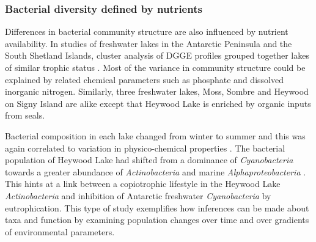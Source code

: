 \subsubsection{Bacterial diversity defined by nutrients}
Differences in bacterial community structure are also influenced by nutrient availability.
In studies of freshwater lakes in the Antarctic Peninsula and the South Shetland Islands, cluster analysis of DGGE profiles grouped together lakes of similar trophic status 
\cite{Schiaffino2009, Villaescusa2010}.
Most of the variance in community structure could be explained by related chemical parameters such as phosphate and dissolved inorganic nitrogen.
Similarly, three freshwater lakes, Moss, Sombre and Heywood on Signy Island are alike except that Heywood Lake is enriched by organic inputs from seals.

Bacterial composition in each lake changed from winter to summer and this was again correlated to variation in physico-chemical properties \cite{Pearce2005}. 
The bacterial population of Heywood Lake had shifted from a dominance of \emph{Cyanobacteria} towards a greater abundance of \emph{Actinobacteria} and marine \emph{Alphaproteobacteria} \cite{Pearce2005}.
This hints at a link between a copiotrophic lifestyle in the Heywood Lake \emph{Actinobacteria} and inhibition of Antarctic freshwater \emph{Cyanobacteria} by eutrophication. 
This type of study exemplifies how inferences can be made about taxa and function by examining population changes over time and over gradients of environmental parameters.

